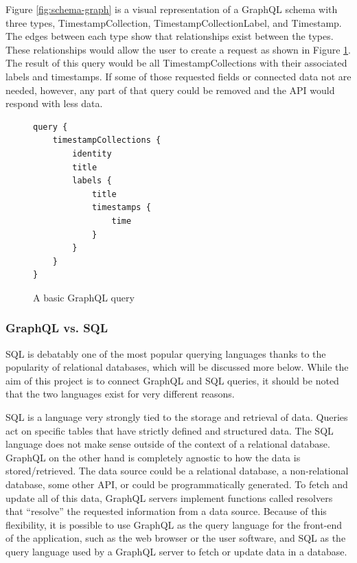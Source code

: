 Figure \ref{fig:schema-graph} is a visual representation of a GraphQL schema with three types, TimestampCollection, TimestampCollectionLabel, and Timestamp.  The edges between each type show that relationships exist between the types. These relationships  would allow the user to create a request as shown in Figure \ref{fig:basic-query}.  The result of this query would be all TimestampCollections with their associated labels and timestamps.  If some of those requested fields or connected data not are needed, however, any part of that query could be removed and the API would respond with less data.

\begin{figure}
    \begin{verbatim}
query {
    timestampCollections {
        identity
        title
        labels {
            title
            timestamps {
                time
            }
        }
    }
}
    \end{verbatim}
    \caption{A basic GraphQL query}
    \label{fig:basic-query}
\end{figure}

\subsubsection{GraphQL vs. SQL}

SQL is debatably one of the most popular querying languages thanks to the popularity of relational databases, which will be discussed more below.  While the aim of this project is to connect GraphQL and SQL queries, it should be noted that the two languages exist for very different reasons.

SQL is a language very strongly tied to the storage and retrieval of data.  Queries act on specific tables that have strictly defined and structured data.  The SQL language does not make sense outside of the context of a relational database.  GraphQL on the other hand is completely agnostic to how the data is stored/retrieved.  The data source could be a relational database, a non-relational database, some other API, or could be programmatically generated. To fetch and update all of this data, GraphQL servers implement functions called resolvers that ``resolve'' the requested information from a data source.  Because of this flexibility, it is possible to use GraphQL as the query language for the front-end of the application, such as the web browser or the user software, and SQL as the query language used by a GraphQL server to fetch or update data in a database.